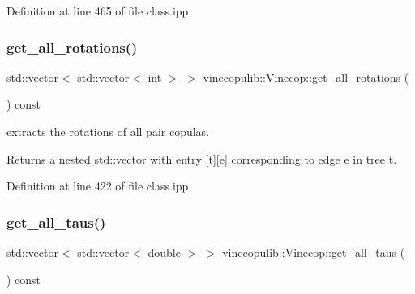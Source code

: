 Definition at line 465 of file class.\+ipp.

\mbox{\label{classvinecopulib_1_1_vinecop_a45dd56984cf7395494ed3fab75c62a1e}} 
\subsubsection{\texorpdfstring{get\+\_\+all\+\_\+rotations()}{get\_all\_rotations()}}
{\footnotesize\ttfamily std\+::vector$<$ std\+::vector$<$ int $>$ $>$ vinecopulib\+::\+Vinecop\+::get\+\_\+all\+\_\+rotations (\begin{DoxyParamCaption}{ }\end{DoxyParamCaption}) const\hspace{0.3cm}{\ttfamily [inline]}}



extracts the rotations of all pair copulas. 

\begin{DoxyReturn}{Returns}
a nested std\+::vector with entry {\ttfamily \mbox{[}t\mbox{]}\mbox{[}e\mbox{]}} corresponding to edge {\ttfamily e} in tree {\ttfamily t}. 
\end{DoxyReturn}


Definition at line 422 of file class.\+ipp.

\mbox{\label{classvinecopulib_1_1_vinecop_ac271e64e1b2dd16f8b5ccaecf3f03e96}} 
\subsubsection{\texorpdfstring{get\+\_\+all\+\_\+taus()}{get\_all\_taus()}}
{\footnotesize\ttfamily std\+::vector$<$ std\+::vector$<$ double $>$ $>$ vinecopulib\+::\+Vinecop\+::get\+\_\+all\+\_\+taus (\begin{DoxyParamCaption}{ }\end{DoxyParamCaption}) const\hspace{0.3cm}{\ttfamily [inline]}}



